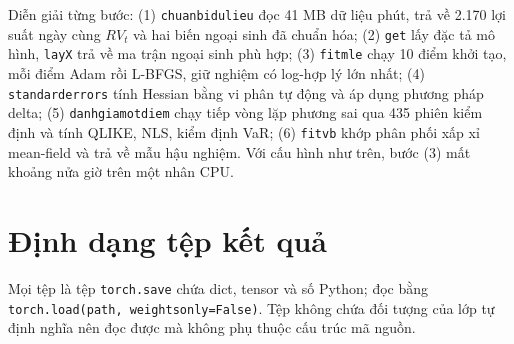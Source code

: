 \documentclass[11pt,a4paper]{article}
\renewcommand{\_}{\gachduoi\allowbreak}
\newcommand{\tep}[1]{\texttt{#1}}
\newcommand{\ham}[1]{\texttt{#1}}
\begin{document}
Diễn giải từng bước: (1) \ham{chuan\_bi\_du\_lieu} đọc 41 MB dữ liệu phút, trả về 2.170 lợi suất ngày cùng $RV_t$ và hai biến ngoại sinh đã chuẩn hóa; (2) \ham{get} lấy đặc tả mô hình, \ham{lay\_X} trả về ma trận ngoại sinh phù hợp; (3) \ham{fit\_mle} chạy 10 điểm khởi tạo, mỗi điểm Adam rồi L-BFGS, giữ nghiệm có log-hợp lý lớn nhất; (4) \ham{standard\_errors} tính Hessian bằng vi phân tự động và áp dụng phương pháp delta; (5) \ham{danh\_gia\_mot\_diem} chạy tiếp vòng lặp phương sai qua 435 phiên kiểm định và tính QLIKE, NLS, kiểm định VaR; (6) \ham{fit\_vb} khớp phân phối xấp xỉ mean-field và trả về mẫu hậu nghiệm. Với cấu hình như trên, bước (3) mất khoảng nửa giờ trên một nhân CPU.

\section{Định dạng tệp kết quả}\label{sec:ket-qua}
Mọi tệp là tệp \tep{torch.save} chứa dict, tensor và số Python; đọc bằng \ham{torch.load(path, weights\_only=False)}. Tệp không chứa đối tượng của lớp tự định nghĩa nên đọc được mà không phụ thuộc cấu trúc mã nguồn.
\end{document}
